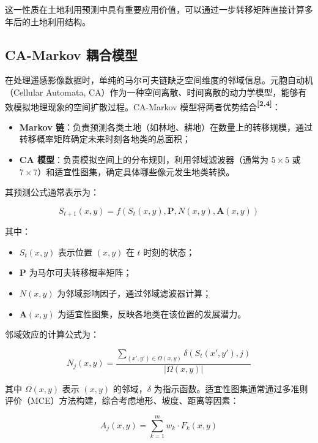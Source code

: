 \documentclass[a4paper,12pt]{ctexart}
\newcommand{\upcite}[1]{\textbf{\textsuperscript{[#1]}}}
\begin{document}
这一性质在土地利用预测中具有重要应用价值，可以通过一步转移矩阵直接计算多年后的土地利用结构。

\subsection{CA-Markov 耦合模型}

在处理遥感影像数据时，单纯的马尔可夫链缺乏空间维度的邻域信息。元胞自动机（Cellular Automata, CA）作为一种空间离散、时间离散的动力学模型，能够有效模拟地理现象的空间扩散过程。CA-Markov 模型将两者优势结合\upcite{2,4}：

\begin{itemize}
    \item \textbf{Markov 链}：负责预测各类土地（如林地、耕地）在数量上的转移规模，通过转移概率矩阵确定未来时刻各地类的总面积；
    \item \textbf{CA 模型}：负责模拟空间上的分布规则，利用邻域滤波器（通常为 $5 \times 5$ 或 $7 \times 7$）和适宜性图集，确定具体哪些像元发生地类转换。
\end{itemize}

其预测公式通常表示为：

\begin{equation}
    S_{t+1}(x,y) = f(S_t(x,y), \mathbf{P}, N(x,y), \mathbf{A}(x,y))
\end{equation}

其中：
\begin{itemize}
    \item $S_t(x,y)$ 表示位置 $(x,y)$ 在 $t$ 时刻的状态；
    \item $\mathbf{P}$ 为马尔可夫转移概率矩阵；
    \item $N(x,y)$ 为邻域影响因子，通过邻域滤波器计算；
    \item $\mathbf{A}(x,y)$ 为适宜性图集，反映各地类在该位置的发展潜力。
\end{itemize}

邻域效应的计算公式为：

\begin{equation}
    N_j(x,y) = \frac{\sum_{(x',y') \in \Omega(x,y)} \delta(S_t(x',y'), j)}{|\Omega(x,y)|}
\end{equation}

其中 $\Omega(x,y)$ 表示 $(x,y)$ 的邻域，$\delta$ 为指示函数。适宜性图集通常通过多准则评价（MCE）方法构建，综合考虑地形、坡度、距离等因素：

\begin{equation}
    A_j(x,y) = \sum_{k=1}^{m} w_k \cdot F_k(x,y)
\end{equation}
\end{document}
